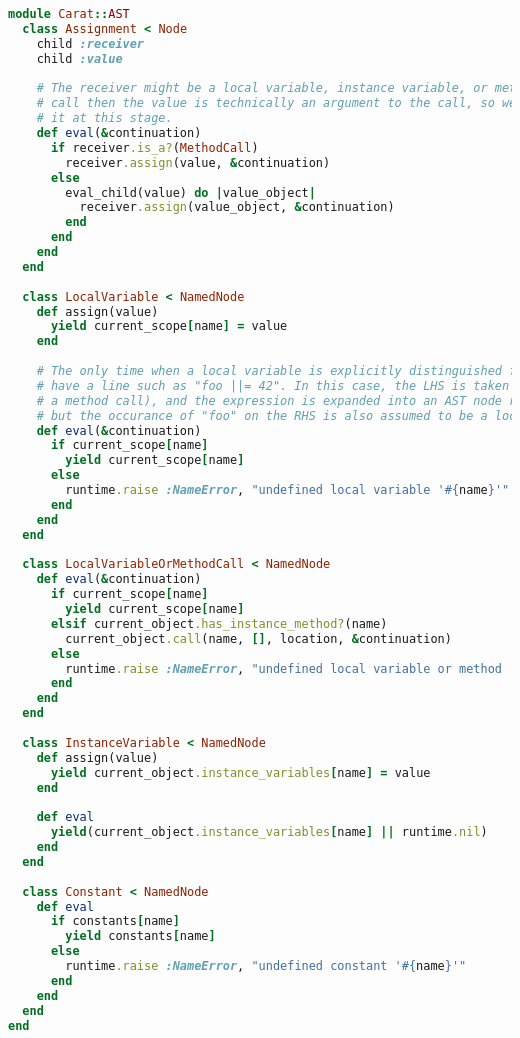 \begin{lstlisting}[title={\small\ttfamily\bfseries ast/variables.rb},language=Ruby]
module Carat::AST
  class Assignment < Node
    child :receiver
    child :value
    
    # The receiver might be a local variable, instance variable, or method call. If it is a method
    # call then the value is technically an argument to the call, so we don't want to evaluate
    # it at this stage.
    def eval(&continuation)
      if receiver.is_a?(MethodCall)
        receiver.assign(value, &continuation)
      else
        eval_child(value) do |value_object|
          receiver.assign(value_object, &continuation)
        end
      end
    end
  end
  
  class LocalVariable < NamedNode
    def assign(value)
      yield current_scope[name] = value
    end
    
    # The only time when a local variable is explicitly distinguished from a method call is when we
    # have a line such as "foo ||= 42". In this case, the LHS is taken to be a local variable (not
    # a method call), and the expression is expanded into an AST node representing "foo = foo || 42",
    # but the occurance of "foo" on the RHS is also assumed to be a local variable.
    def eval(&continuation)
      if current_scope[name]
        yield current_scope[name]
      else
        runtime.raise :NameError, "undefined local variable '#{name}'"
      end
    end
  end
  
  class LocalVariableOrMethodCall < NamedNode
    def eval(&continuation)
      if current_scope[name]
        yield current_scope[name]
      elsif current_object.has_instance_method?(name)
        current_object.call(name, [], location, &continuation)
      else
        runtime.raise :NameError, "undefined local variable or method '#{name}'"
      end
    end
  end
  
  class InstanceVariable < NamedNode
    def assign(value)
      yield current_object.instance_variables[name] = value
    end
    
    def eval
      yield(current_object.instance_variables[name] || runtime.nil)
    end
  end
  
  class Constant < NamedNode
    def eval
      if constants[name]
        yield constants[name]
      else
        runtime.raise :NameError, "undefined constant '#{name}'"
      end
    end
  end
end

\end{lstlisting}
